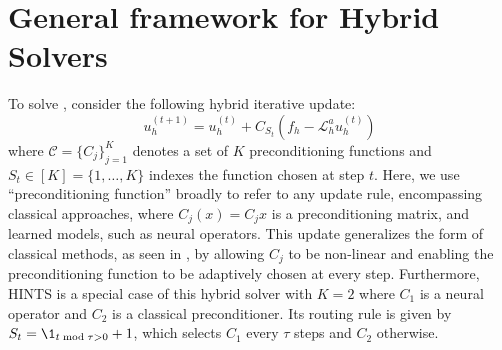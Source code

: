 \documentclass{article} %
\begin{document}

\section{General framework for Hybrid Solvers}


To solve , consider the following hybrid iterative update:
\begin{equation}
     u^{\left(t + 1\right)}_h = u^{\left(t\right)}_h + C_{S_t}\left(f_h - \mathcal{L}_h^au^{\left(t \right)}_h\right)
\end{equation}
where $\mathcal{C} =\{C_{j}\}_{j = 1}^K$ denotes a set of $K$ preconditioning functions and $S_t \in [K] = \{1, \dots, K\}$ indexes the function chosen at step $t$. Here, we use ``preconditioning function'' broadly to refer to any update rule, encompassing classical approaches, where $C_j(x) = C_jx$ is a preconditioning matrix, and learned models, such as neural operators. 
This update generalizes the form of classical methods, as seen in , by allowing $C_j$ to be non-linear and enabling the preconditioning function to be adaptively chosen at every step. Furthermore, HINTS \citep{zhang2024blending} is a special case of this hybrid solver with $K = 2$ where  $C_1$ is a neural operator and $C_2$ is a classical preconditioner. Its routing rule is given by $S_t = \1_{t \bmod \tau > 0} + 1$, which selects $C_1$ every $\tau$ steps and $C_2$ otherwise.
\end{document}
